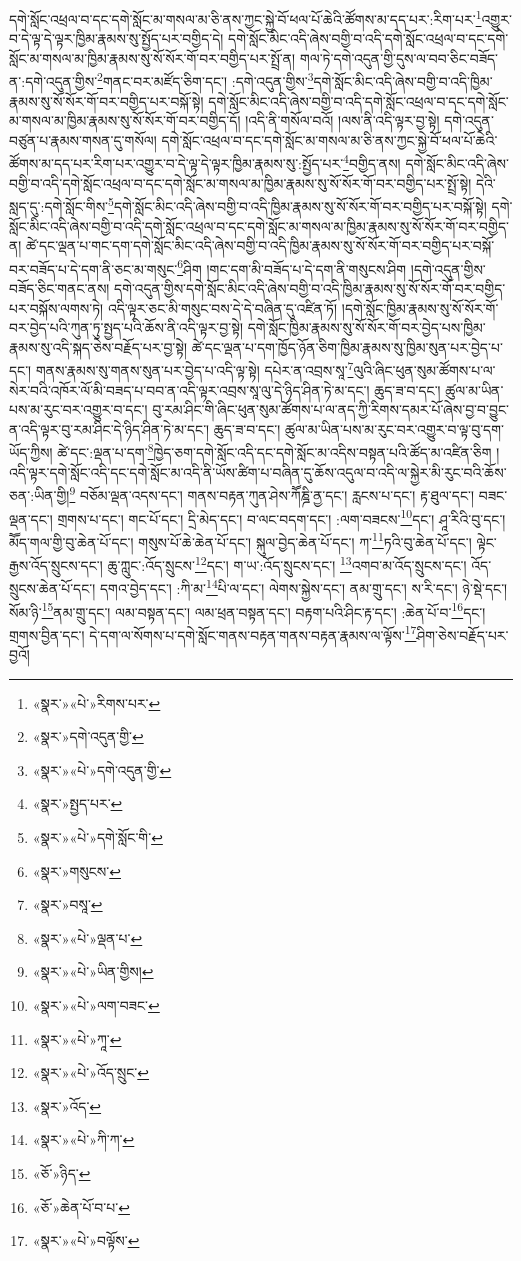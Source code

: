 དགེ་སློང་འཕྲལ་བ་དང་དགེ་སློང་མ་གསལ་མ་ཅི་ནས་ཀྱང་སྐྱེ་བོ་ཕལ་པོ་ཆེའི་ཚོགས་མ་དད་པར་:རིག་པར་\footnote{«སྣར་»«པེ་»རིགས་པར་}འགྱུར་བ་དེ་ལྟ་དེ་ལྟར་ཁྱིམ་རྣམས་སུ་སྤྱོད་པར་བགྱིད་དེ། དགེ་སློང་མིང་འདི་ཞེས་བགྱི་བ་འདི་དགེ་སློང་འཕྲལ་བ་དང་དགེ་སློང་མ་གསལ་མ་ཁྱིམ་རྣམས་སུ་སོ་སོར་གོ་བར་བགྱིད་པར་སྤྲོ་ན། གལ་ཏེ་དགེ་འདུན་གྱི་དུས་ལ་བབ་ཅིང་བཟོད་ན་:དགེ་འདུན་གྱིས་\footnote{«སྣར་»དགེ་འདུན་གྱི་}གནང་བར་མཛོད་ཅིག་དང་། :དགེ་འདུན་གྱིས་\footnote{«སྣར་»«པེ་»དགེ་འདུན་གྱི་}དགེ་སློང་མིང་འདི་ཞེས་བགྱི་བ་འདི་ཁྱིམ་རྣམས་སུ་སོ་སོར་གོ་བར་བགྱིད་པར་བསྐོ་སྟེ། དགེ་སློང་མིང་འདི་ཞེས་བགྱི་བ་འདི་དགེ་སློང་འཕྲལ་བ་དང་དགེ་སློང་མ་གསལ་མ་ཁྱིམ་རྣམས་སུ་སོ་སོར་གོ་བར་བགྱིད་དོ། །འདི་ནི་གསོལ་བའོ། །ལས་ནི་འདི་ལྟར་བྱ་སྟེ། དགེ་འདུན་བཙུན་པ་རྣམས་གསན་དུ་གསོལ། དགེ་སློང་འཕྲལ་བ་དང་དགེ་སློང་མ་གསལ་མ་ཅི་ནས་ཀྱང་སྐྱེ་བོ་ཕལ་པོ་ཆེའི་ཚོགས་མ་དད་པར་རིག་པར་འགྱུར་བ་དེ་ལྟ་དེ་ལྟར་ཁྱིམ་རྣམས་སུ་:སྤྱོད་པར་\footnote{«སྣར་»སྤྱད་པར་}བགྱིད་ནས། དགེ་སློང་མིང་འདི་ཞེས་བགྱི་བ་འདི་དགེ་སློང་འཕྲལ་བ་དང་དགེ་སློང་མ་གསལ་མ་ཁྱིམ་རྣམས་སུ་སོ་སོར་གོ་བར་བགྱིད་པར་སྤྲོ་སྟེ། དེའི་སླད་དུ་:དགེ་སློང་གིས་\footnote{«སྣར་»«པེ་»དགེ་སློང་གི་}དགེ་སློང་མིང་འདི་ཞེས་བགྱི་བ་འདི་ཁྱིམ་རྣམས་སུ་སོ་སོར་གོ་བར་བགྱིད་པར་བསྐོ་སྟེ། དགེ་སློང་མིང་འདི་ཞེས་བགྱི་བ་འདི་དགེ་སློང་འཕྲལ་བ་དང་དགེ་སློང་མ་གསལ་མ་ཁྱིམ་རྣམས་སུ་སོ་སོར་གོ་བར་བགྱིད་ན། ཚེ་དང་ལྡན་པ་གང་དག་དགེ་སློང་མིང་འདི་ཞེས་བགྱི་བ་འདི་ཁྱིམ་རྣམས་སུ་སོ་སོར་གོ་བར་བགྱིད་པར་བསྐོ་བར་བཟོད་པ་དེ་དག་ནི་ཅང་མ་གསུང་\footnote{«སྣར་»གསུངས་}ཤིག །གང་དག་མི་བཟོད་པ་དེ་དག་ནི་གསུངས་ཤིག །དགེ་འདུན་གྱིས་བཟོད་ཅིང་གནང་ནས། དགེ་འདུན་གྱིས་དགེ་སློང་མིང་འདི་ཞེས་བགྱི་བ་འདི་ཁྱིམ་རྣམས་སུ་སོ་སོར་གོ་བར་བགྱིད་པར་བསྐོས་ལགས་ཏེ། འདི་ལྟར་ཅང་མི་གསུང་བས་དེ་དེ་བཞིན་དུ་འཛིན་ཏོ། །དགེ་སློང་ཁྱིམ་རྣམས་སུ་སོ་སོར་གོ་བར་བྱེད་པའི་ཀུན་ཏུ་སྤྱད་པའི་ཆོས་ནི་འདི་ལྟར་བྱ་སྟེ། དགེ་སློང་ཁྱིམ་རྣམས་སུ་སོ་སོར་གོ་བར་བྱེད་པས་ཁྱིམ་རྣམས་སུ་འདི་སྐད་ཅེས་བརྗོད་པར་བྱ་སྟེ། ཚེ་དང་ལྡན་པ་དག་ཁྱོད་ཉོན་ཅིག་ཁྱིམ་རྣམས་སུ་ཁྱིམ་སུན་པར་བྱེད་པ་དང་། གནས་རྣམས་སུ་གནས་སུན་པར་བྱེད་པ་འདི་ལྟ་སྟེ། དཔེར་ན་འབྲས་སཱ་\footnote{«སྣར་»བསཱ་}ལུའི་ཞིང་ཕུན་སུམ་ཚོགས་པ་ལ་སེར་བའི་འཁོར་ལོ་མི་བཟད་པ་བབ་ན་འདི་ལྟར་འབྲས་སཱ་ལུ་དེ་ཉིད་ཤིན་ཏེ་མ་དང་། ཆུད་ཟ་བ་དང་། ཚུལ་མ་ཡིན་པས་མ་རུང་བར་འགྱུར་བ་དང་། བུ་རམ་ཤིང་གི་ཞིང་ཕུན་སུམ་ཚོགས་པ་ལ་ནད་ཀྱི་རིགས་དམར་པོ་ཞེས་བྱ་བ་བྱུང་ན་འདི་ལྟར་བུ་རམ་ཤིང་དེ་ཉིད་ཤིན་ཏེ་མ་དང་། ཆུད་ཟ་བ་དང་། ཚུལ་མ་ཡིན་པས་མ་རུང་བར་འགྱུར་བ་ལྟ་བུ་དག་ཡོད་ཀྱིས། ཚེ་དང་:ལྡན་པ་དག་\footnote{«སྣར་»«པེ་»ལྡན་པ་}ཁྱེད་ཅག་དགེ་སློང་འདི་དང་དགེ་སློང་མ་འདིས་བསྟན་པའི་ཚོད་མ་འཛིན་ཅིག །འདི་ལྟར་དགེ་སློང་འདི་དང་དགེ་སློང་མ་འདི་ནི་ཡོས་ཚིག་པ་བཞིན་དུ་ཆོས་འདུལ་བ་འདི་ལ་སྐྱེར་མི་རུང་བའི་ཆོས་ཅན་:ཡིན་གྱི།\footnote{«སྣར་»«པེ་»ཡིན་གྱིས།} བཅོམ་ལྡན་འདས་དང་། གནས་བརྟན་ཀུན་ཤེས་ཀཽཎྜི་ནྱ་དང་། རླངས་པ་དང་། རྟ་ཐུལ་དང་། བཟང་ལྡན་དང་། གྲགས་པ་དང་། གང་པོ་དང་། དྲི་མེད་དང་། བ་ལང་བདག་དང་། :ལག་བཟངས་\footnote{«སྣར་»«པེ་»ལག་བཟང་}དང་། ཤཱ་རིའི་བུ་དང་། མཽད་གལ་གྱི་བུ་ཆེན་པོ་དང་། གསུས་པོ་ཆེ་ཆེན་པོ་དང་། སྐུལ་བྱེད་ཆེན་པོ་དང་། ཀ་\footnote{«སྣར་»«པེ་»ཀཱ་}ཏའི་བུ་ཆེན་པོ་དང་། ལྟེང་རྒྱས་འོད་སྲུངས་དང་། ཆུ་ཀླུང་:འོད་སྲུངས་\footnote{«སྣར་»«པེ་»འོད་སྲུང་}དང་། ག་ཡ་:འོད་སྲུངས་དང་། \footnote{«སྣར་»འོད་}འགབ་མ་འོད་སྲུངས་དང་། འོད་སྲུངས་ཆེན་པོ་དང་། དགའ་བྱེད་དང་། :ཀི་མ་\footnote{«སྣར་»«པེ་»ཀི་ཀ་}པི་ལ་དང་། ལེགས་སྐྱེས་དང་། ནམ་གྲུ་དང་། ས་རི་དང་། ཉེ་སྡེ་དང་། སོམ་ཉི་\footnote{«ཅོ་»ཉིད་}ནམ་གྲུ་དང་། ལམ་བསྟན་དང་། ལམ་ཕྲན་བསྟན་དང་། བརྟག་པའི་ཤིང་རྟ་དང་། :ཆེན་པོ་བ་\footnote{«ཅོ་»ཆེན་པོ་བ་པ་}དང་། གྲགས་བྱིན་དང་། དེ་དག་ལ་སོགས་པ་དགེ་སློང་གནས་བརྟན་གནས་བརྟན་རྣམས་ལ་ལྟོས་\footnote{«སྣར་»«པེ་»བལྟོས་}ཤིག་ཅེས་བརྗོད་པར་བྱའོ། 